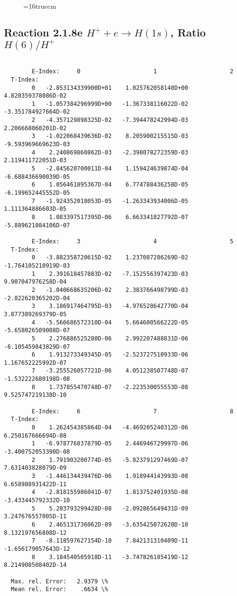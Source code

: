 \documentclass[12pt,dvipdfmx]{article}
\begin{document}
\begin{figure} \label{2.1.8rd}
\epsfxsize=16truecm
\end{figure}
\newpage



\subsection{
Reaction 2.1.8e  $H^+ + e \rightarrow H(1s) $,  Ratio $H(6)/H^+$
}

\begin{small}\begin{verbatim}

        E-Index:     0                     1                     2
  T-Index:
        0   -2.853134339900D+01    1.025762058140D+00    4.820359378086D-02
        1   -1.057384296999D+00   -1.367338116022D-02   -3.351784927664D-02
        2   -4.357129898325D-02   -7.394478242994D-03    2.206668060201D-02
        3   -1.022068439636D-02    8.205900215515D-03   -9.593969669623D-03
        4    2.240869860862D-03   -2.398078272359D-03    2.119411722051D-03
        5   -2.845620700011D-04    1.159424639874D-04   -6.688436690039D-05
        6    1.056461895367D-04    6.774788436258D-05   -6.199652445552D-05
        7   -1.924352018053D-05   -1.263343934006D-05    1.111364886603D-05
        8    1.083397517395D-06    6.663341827792D-07   -5.889621084106D-07

        E-Index:     3                     4                     5
  T-Index:
        0   -3.882358720615D-02    1.237087286269D-02   -1.764105210919D-03
        1    2.391618457883D-02   -7.152556397423D-03    9.907047976258D-04
        2   -1.040668635206D-02    2.383766498799D-03   -2.822620365202D-04
        3    3.186917464795D-03   -4.976528642770D-04    3.877389269379D-05
        4   -5.566686572310D-04    5.664600566222D-05   -5.658026509008D-07
        5    2.276886525280D-06    2.992207488831D-06   -6.105459843829D-07
        6    1.913273349345D-05   -2.523727510933D-06    1.167652225992D-07
        7   -3.255526057721D-06    4.051238507748D-07   -1.532222680198D-08
        8    1.737855470748D-07   -2.223530055553D-08    9.525747219138D-10

        E-Index:     6                     7                     8
  T-Index:
        0    1.262454385864D-04   -4.469205240312D-06    6.250167666694D-08
        1   -6.978776837879D-05    2.446946729997D-06   -3.400752053390D-08
        2    1.791903200774D-05   -5.823791297469D-07    7.631403828079D-09
        3   -1.446134439476D-06    1.918944143993D-08    6.658988931422D-11
        4   -2.818155986041D-07    1.813752401935D-08   -3.433445792332D-10
        5    5.203793299428D-08   -2.092865649431D-09    3.247676557005D-11
        6    2.465131736062D-09   -3.635425072620D-10    8.132197656808D-12
        7   -8.118597627154D-10    7.842131310409D-11   -1.656179057643D-12
        8    3.184540505918D-11   -3.747826185419D-12    8.214908508402D-14

  Max. rel. Error:   2.9379 \%
  Mean rel. Error:    .6634 \%


\end{verbatim}\end{small}
\end{document}
